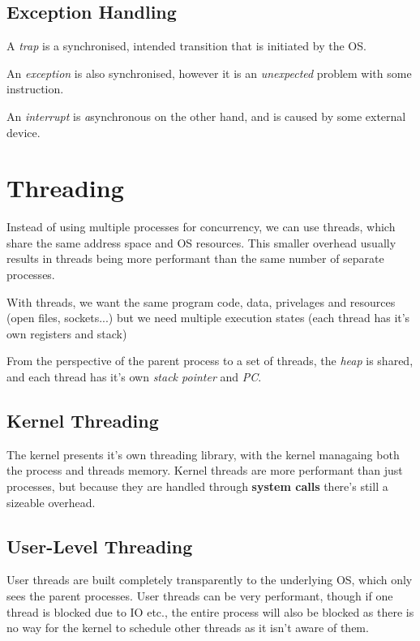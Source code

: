 \documentclass{article}
\begin{document}
\subsection{Exception Handling}

A \textit{trap} is a synchronised, intended transition that is initiated by the OS.

An \textit{exception} is also synchronised, however it is an \textit{unexpected} problem with some instruction.

An \textit{interrupt} is \textit{a}synchronous on the other hand, and is caused by some external device.


\filbreak
\section{Threading}

Instead of using multiple processes for concurrency, we can use threads, which share the same address
space and OS resources. This smaller overhead usually results in threads being more performant than
the same number of separate processes.

With threads, we want the same program code, data, privelages and resources (open files, sockets...) but
we need multiple execution states (each thread has it's own registers and stack)

From the perspective of the parent process to a set of threads, the \emph{heap} is shared, and each thread has
it's own \emph{stack pointer} and \emph{PC}.

\subsection{Kernel Threading}

The kernel presents it's own threading library, with the kernel managaing both the process and threads memory.
Kernel threads are more performant than just processes, but because they are handled through \textbf{system calls}
there's still a sizeable overhead.

\subsection{User-Level Threading}

User threads are built completely transparently to the underlying OS, which only sees the parent processes. User
threads can be very performant, though if one thread is blocked due to IO etc., the entire process will also be
blocked as there is no way for the kernel to schedule other threads as it isn't aware of them.
\end{document}
